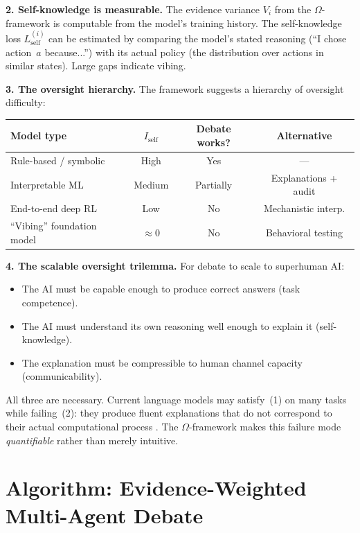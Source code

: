 \documentclass[11pt,a4paper]{article}
\newcommand{\Lself}{L_{\text{self}}}
\begin{document}
\medskip

\noindent\textbf{2. Self-knowledge is measurable.}\quad
The evidence variance $V_i$ from the $\Omega$-framework is computable
from the model's training history. The self-knowledge loss
$\Lself^{(i)}$ can be estimated by comparing the model's stated
reasoning (``I chose action~$a$ because...'') with its actual policy
(the distribution over actions in similar states). Large gaps indicate
vibing.

\medskip

\noindent\textbf{3. The oversight hierarchy.}\quad
The framework suggests a hierarchy of oversight difficulty:

\begin{center}
\begin{tabular}{lccc}
\textbf{Model type} & $I_{\text{self}}$ & \textbf{Debate works?}
& \textbf{Alternative} \\
\hline
Rule-based / symbolic & High & Yes & --- \\
Interpretable ML & Medium & Partially & Explanations + audit \\
End-to-end deep RL & Low & No & Mechanistic interp. \\
``Vibing'' foundation model & $\approx 0$ & No & Behavioral testing \\
\end{tabular}
\end{center}

\medskip

\noindent\textbf{4. The scalable oversight trilemma.}\quad
For debate to scale to superhuman AI:
\begin{itemize}
    \item The AI must be capable enough to produce correct answers
    (task competence).
    \item The AI must understand its own reasoning well enough to
    explain it (self-knowledge).
    \item The explanation must be compressible to human channel capacity
    (communicability).
\end{itemize}
All three are necessary. Current language models may satisfy~(1) on
many tasks while failing~(2): they produce fluent explanations that
do not correspond to their actual computational process
\cite{bowman2022}. The $\Omega$-framework makes this failure mode
\emph{quantifiable} rather than merely intuitive.


\section{Algorithm: Evidence-Weighted Multi-Agent Debate}
\label{sec:algorithm}
\end{document}
